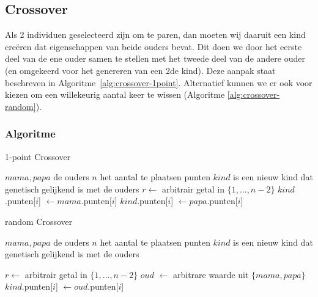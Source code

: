 %
\subsection{Crossover}
\label{sub:crossover}
Als 2 individuen geselecteerd zijn om te paren, dan moeten wij daaruit een kind creëren dat eigenschappen van beide ouders bevat. Dit doen we door het eerste deel van de ene ouder samen te stellen met het tweede deel van de andere ouder (en omgekeerd voor het genereren van een 2de kind). Deze aanpak staat beschreven in Algoritme~\ref{alg:crossover-1point}.
Alternatief kunnen we er ook voor kiezen om een willekeurig aantal keer te wissen (Algoritme \ref{alg:crossover-random}).
\subsubsection{Algoritme}
	\begin{algorithm}[H]
	 	\caption{1-point Crossover}
		\begin{algorithmic}
		\Require \State $mama, papa$ de ouders \State $n$ het aantal te plaatsen punten
		\Ensure $kind$ is een nieuw kind dat genetisch gelijkend is met de ouders
		\State $r \gets$ arbitrair getal in $\lbrace 1, \dots , n-2\rbrace$
			\State $kind$.punten[$i$] $\gets mama$.punten[$i$]
		\EndFor
			\State $kind$.punten[$i$] $\gets papa$.punten[$i$]
		\EndFor
		\end{algorithmic}
		\label{alg:crossover-1point}
	\end{algorithm}		

	\begin{algorithm}[H]
	 	\caption{random Crossover}
		\begin{algorithmic}
		\Require \State $mama, papa$ de ouders \State $n$ het aantal te plaatsen punten
		\Ensure $kind$ is een nieuw kind dat genetisch gelijkend is met de ouders
		
		\State $r \gets$ arbitrair getal in $\lbrace 1, \dots , n-2\rbrace$
		\For{i \textbf{from} 0 \textbf{to} $n-1$}
		\State $oud$ $\gets$ arbitrare waarde uit $\lbrace mama, papa \rbrace$
		\State $kind$.punten[$i$] $\gets oud$.punten[$i$]
			
		\EndFor

		\end{algorithmic}
		\label{alg:crossover-random}
	\end{algorithm}		



